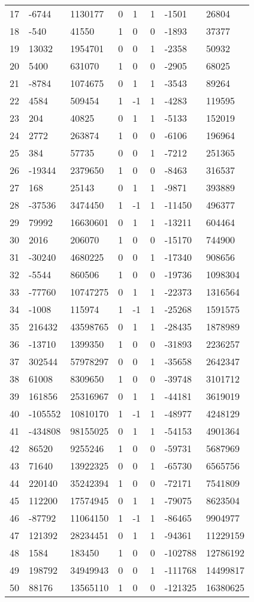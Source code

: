 \documentclass{amsart}
\begin{document}
\begin{longtable}{|l|l|l|lllll|}
17&-6744&1130177&0&1&1&-1501&26804\\
18&-540&41550&1&0&0&-1893&37377\\
19&13032&1954701&0&0&1&-2358&50932\\
20&5400&631070&1&0&0&-2905&68025\\
21&-8784&1074675&0&1&1&-3543&89264\\
22&4584&509454&1&-1&1&-4283&119595\\
23&204&40825&0&1&1&-5133&152019\\
24&2772&263874&1&0&0&-6106&196964\\
25&384&57735&0&0&1&-7212&251365\\
26&-19344&2379650&1&0&0&-8463&316537\\
27&168&25143&0&1&1&-9871&393889\\
28&-37536&3474450&1&-1&1&-11450&496377\\
29&79992&16630601&0&1&1&-13211&604464\\
30&2016&206070&1&0&0&-15170&744900\\
31&-30240&4680225&0&0&1&-17340&908656\\
32&-5544&860506&1&0&0&-19736&1098304\\
33&-77760&10747275&0&1&1&-22373&1316564\\
34&-1008&115974&1&-1&1&-25268&1591575\\
35&216432&43598765&0&1&1&-28435&1878989\\
36&-13710&1399350&1&0&0&-31893&2236257\\
37&302544&57978297&0&0&1&-35658&2642347\\
38&61008&8309650&1&0&0&-39748&3101712\\
39&161856&25316967&0&1&1&-44181&3619019\\
40&-105552&10810170&1&-1&1&-48977&4248129\\
41&-434808&98155025&0&1&1&-54153&4901364\\
42&86520&9255246&1&0&0&-59731&5687969\\
43&71640&13922325&0&0&1&-65730&6565756\\
44&220140&35242394&1&0&0&-72171&7541809\\
45&112200&17574945&0&1&1&-79075&8623504\\
46&-87792&11064150&1&-1&1&-86465&9904977\\
47&121392&28234451&0&1&1&-94361&11229159\\
48&1584&183450&1&0&0&-102788&12786192\\
49&198792&34949943&0&0&1&-111768&14499817\\
50&88176&13565110&1&0&0&-121325&16380625\\
\hline
\end{longtable}
\end{document}
